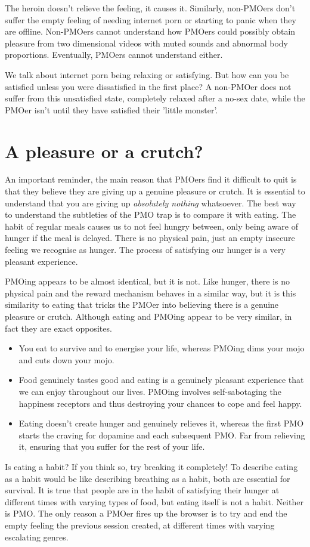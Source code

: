 \documentclass[easypeasy.tex]{subfiles}
\begin{document}
The heroin doesn't relieve the feeling, it causes it. Similarly, non-PMOers don't suffer the empty feeling of needing internet porn or starting to panic when they are offline. Non-PMOers cannot understand how PMOers could possibly obtain pleasure from two dimensional videos with muted sounds and abnormal body proportions. Eventually, PMOers cannot understand either.

We talk about internet porn being relaxing or satisfying. But how can you be satisfied unless you were dissatisfied in the first place? A non-PMOer does not suffer from this unsatisfied state, completely relaxed after a no-sex date, while the PMOer isn't until they have satisfied their 'little monster'.

    \section{A pleasure or a crutch?}
An important reminder, the main reason that PMOers find it difficult to quit is that they believe they are giving up a genuine pleasure or crutch. It is essential to understand that you are giving up \textit{absolutely nothing} whatsoever. The best way to understand the subtleties of the PMO trap is to compare it with eating. The habit of regular meals causes us to not feel hungry between, only being aware of hunger if the meal is delayed. There is no physical pain, just an empty insecure feeling we recognise as hunger. The process of satisfying our hunger is a very pleasant experience.

PMOing appears to be almost identical, but it is not. Like hunger, there is no physical pain and the reward mechanism behaves in a similar way, but it is this similarity to eating that tricks the PMOer into believing there is a genuine pleasure or crutch. Although eating and PMOing appear to be very similar, in fact they are exact opposites.
\begin{itemize}
  \item You eat to survive and to energise your life, whereas PMOing dims your mojo and cuts down your mojo.
  \item Food genuinely tastes good and eating is a genuinely pleasant experience that we can enjoy throughout our lives. PMOing involves self-sabotaging the happiness receptors and thus destroying your chances to cope and feel happy.
  \item Eating doesn't create hunger and genuinely relieves it, whereas the first PMO starts the craving for dopamine and each subsequent PMO. Far from relieving it, ensuring that you suffer for the rest of your life.
  \end{itemize}
Is eating a habit? If you think so, try breaking it completely! To describe eating as a habit would be like describing breathing as a habit, both are essential for survival. It is true that people are in the habit of satisfying their hunger at different times with varying types of food, but eating itself is not a habit. Neither is PMO. The only reason a PMOer fires up the browser is to try and end the empty feeling the previous session created, at different times with varying escalating genres.
\end{document}
